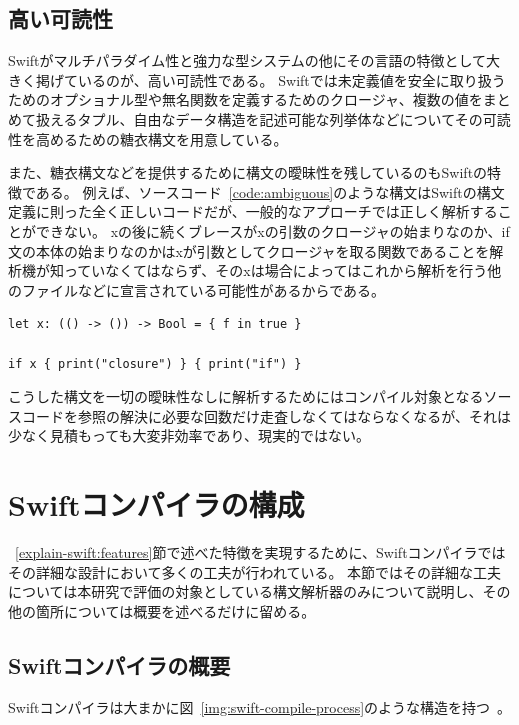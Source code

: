 \subsection{高い可読性}
\label{explain-swift:features:readability}

Swiftがマルチパラダイム性と強力な型システムの他にその言語の特徴として大きく掲げているのが、高い可読性である。
Swiftでは未定義値を安全に取り扱うためのオプショナル型や無名関数を定義するためのクロージャ、複数の値をまとめて扱えるタプル、自由なデータ構造を記述可能な列挙体などについてその可読性を高めるための糖衣構文を用意している。

また、糖衣構文などを提供するために構文の曖昧性を残しているのもSwiftの特徴である。
例えば、ソースコード~\ref{code:ambiguous}のような構文はSwiftの構文定義に則った全く正しいコードだが、一般的なアプローチでは正しく解析することができない。
xの後に続くブレースがxの引数のクロージャの始まりなのか、if文の本体の始まりなのかはxが引数としてクロージャを取る関数であることを解析機が知っていなくてはならず、そのxは場合によってはこれから解析を行う他のファイルなどに宣言されている可能性があるからである。

\begin{lstlisting}[caption=曖昧な構文を持った正しいSwiftコード, label=code:ambiguous]
let x: (() -> ()) -> Bool = { f in true }

if x { print("closure") } { print("if") }
\end{lstlisting}

こうした構文を一切の曖昧性なしに解析するためにはコンパイル対象となるソースコードを参照の解決に必要な回数だけ走査しなくてはならなくなるが、それは少なく見積もっても大変非効率であり、現実的ではない。


\section{Swiftコンパイラの構成}
\label{explain-swift:structure}

~\ref{explain-swift:features}節で述べた特徴を実現するために、Swiftコンパイラではその詳細な設計において多くの工夫が行われている。
本節ではその詳細な工夫については本研究で評価の対象としている構文解析器のみについて説明し、その他の箇所については概要を述べるだけに留める。

\subsection{Swiftコンパイラの概要}

Swiftコンパイラは大まかに図~\ref{img:swift-compile-process}のような構造を持つ~\cite{sil}。


